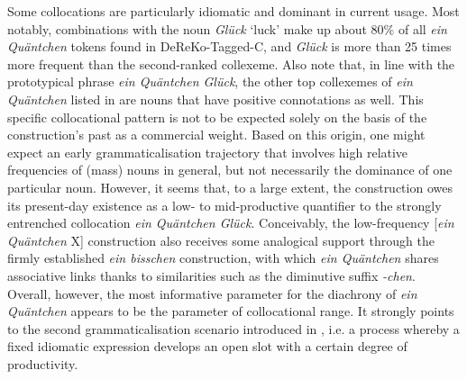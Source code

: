 \documentclass[output=paper]{langsci/langscibook}
\begin{document}
Some collocations are particularly idiomatic and dominant in current usage. Most notably, combinations with the noun \textit{Glück} ‘luck’ make up about 80\% of all \textit{ein Quäntchen} tokens found in DeReKo-Tagged-C, and \textit{Glück} is more than 25 times more frequent than the second-ranked collexeme. Also note that, in line with the prototypical phrase \textit{ein Quäntchen Glück}, the other top collexemes of \textit{ein Quäntchen} listed in  are nouns that have positive connotations as well. This specific collocational pattern is not to be expected solely on the basis of the construction’s past as a commercial weight. Based on this origin, one might expect an early grammaticalisation trajectory that involves high relative frequencies of (mass) nouns in general, but not necessarily the dominance of one particular noun. However, it seems that, to a large extent, the construction owes its present-day existence as a low- to mid-productive quantifier to the strongly entrenched collocation \textit{ein Quäntchen Glück}. Conceivably, the low-frequency [\textit{ein Quäntchen} X] construction also receives some analogical support through the firmly established \textit{ein bisschen} construction, with which \textit{ein Quäntchen} shares associative links thanks to similarities such as the diminutive suffix \textit{-chen}. Overall, however, the most informative parameter for the diachrony of \textit{ein Quäntchen} appears to be the parameter of collocational range. It strongly points to the second grammaticalisation scenario introduced in , i.e. a process whereby a fixed idiomatic expression develops an open slot with a certain degree of productivity. 
\end{document}
